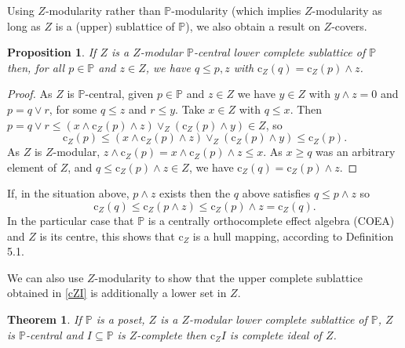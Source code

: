 \documentclass{amsart}
\newtheorem{thm}{Theorem}[section]
\newtheorem{prp}[prp]{Proposition}
\theoremstyle{definition}
\numberwithin{equation}{section}
\begin{document}
Using $Z$-modularity rather than $\mathbb{P}$-modularity (which implies $Z$-modularity as long as $Z$ is a (upper) sublattice of $\mathbb{P}$), we also obtain a result on $Z$-covers.

\begin{prp}
If $Z$ is a $Z$-modular $\mathbb{P}$-central lower complete sublattice of $\mathbb{P}$ then, for all $p\in\mathbb{P}$ and $z\in Z$, we have $q\leq p,z$ with $\mathrm{c}_Z(q)=\mathrm{c}_Z(p)\wedge z$.
\end{prp}

\begin{proof}
As $Z$ is $\mathbb{P}$-central, given $p\in\mathbb{P}$ and $z\in Z$ we have $y\in Z$ with $y\wedge z=0$ and $p=q\vee r$, for some $q\leq z$ and $r\leq y$.  Take $x\in Z$ with $q\leq x$.  Then $p=q\vee r\leq(x\wedge\mathrm{c}_Z(p)\wedge z)\vee_Z(\mathrm{c}_Z(p)\wedge y)\in Z$, so \[\mathrm{c}_Z(p)\leq(x\wedge\mathrm{c}_Z(p)\wedge z)\vee_Z(\mathrm{c}_Z(p)\wedge y)\leq\mathrm{c}_Z(p).\]  As $Z$ is $Z$-modular, $z\wedge\mathrm{c}_Z(p)=x\wedge\mathrm{c}_Z(p)\wedge z\leq x$.  As $x\geq q$ was an arbitrary element of $Z$, and $q\leq\mathrm{c}_Z(p)\wedge z\in Z$, we have $\mathrm{c}_Z(q)=\mathrm{c}_Z(p)\wedge z$.
\end{proof}

If, in the situation above, $p\wedge z$ exists then the $q$ above satisfies $q\leq p\wedge z$ so
\begin{equation}\label{cpz}
\mathrm{c}_Z(q)\leq\mathrm{c}_Z(p\wedge z)\leq\mathrm{c}_Z(p)\wedge z=\mathrm{c}_Z(q).
\end{equation}
In the particular case that $\mathbb{P}$ is a centrally orthocomplete effect algebra (COEA) and $Z$ is its centre, this shows that $\mathrm{c}_Z$ is a hull mapping, according to \cite{FoulisPulmannova2010b} Definition 5.1.

We can also use $Z$-modularity to show that the upper complete sublattice obtained in \autoref{cZI} is additionally a lower set in $Z$. 

\begin{thm}\label{cZIMZ}
If $\mathbb{P}$ is a poset, $Z$ is a $Z$-modular lower complete sublattice of $\mathbb{P}$, $Z$ is $\mathbb{P}$-central and $I\subseteq\mathbb{P}$ is $Z$-complete then $\mathrm{c}_ZI$ is complete ideal of $Z$.
\end{thm}
\end{document}
